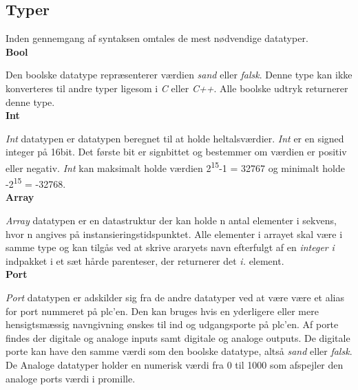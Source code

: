 \subsection{Typer}
Inden gennemgang af syntaksen omtales de mest nødvendige datatyper.\\

\noindent\textbf{Bool}

\noindent Den boolske datatype repræsenterer værdien \textit{sand} eller \textit{falsk}. Denne type kan ikke konverteres til andre typer ligesom i \textit{C} eller \textit{C++}. Alle boolske udtryk returnerer denne type.\\

\noindent\textbf{Int}

\noindent\textit{Int} datatypen er datatypen beregnet til at holde heltalsværdier. \textit{Int} er en signed integer på 16bit. Det første bit er signbittet og bestemmer om værdien er positiv eller negativ. \textit{Int} kan maksimalt holde værdien 2\textsuperscript{15}-1 = 32767 og minimalt holde -2\textsuperscript{15} = -32768.\\

\noindent\textbf{Array}

\noindent\textit{Array} datatypen er en datastruktur der kan holde n antal elementer i sekvens, hvor n angives på instansieringstidspunktet. Alle elementer i arrayet skal være i samme type og kan tilgås ved at skrive araryets navn efterfulgt af en \textit{integer} \textit{i} indpakket i et sæt hårde parenteser, der returnerer det \textit{i.} element.\\

\noindent\textbf{Port}

\noindent\textit{Port} datatypen er adskilder sig fra de andre datatyper ved at være være et alias for port nummeret på \gls{plc}'en. Den kan bruges hvis en yderligere eller mere hensigtsmæssig navngivning ønskes til ind og udgangsporte på \gls{plc}'en.
Af porte findes der digitale og analoge inputs samt digitale og analoge outputs. De digitale porte kan have den samme værdi som den boolske datatype, altså \textit{sand} eller \textit{falsk}. De Analoge datatyper holder en numerisk værdi fra 0 til 1000 som afspejler den analoge ports værdi i promille.\\
